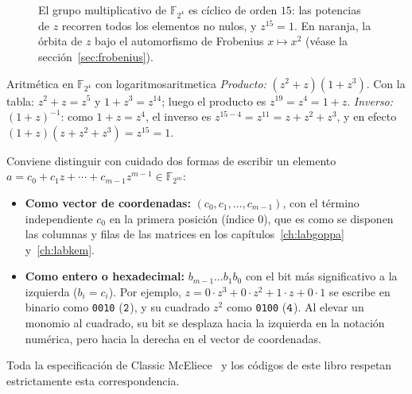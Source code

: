 \documentclass[11pt,a4paper,oneside]{report}
\newcommand{\F}{\mathbb{F}}
\newcommand{\GF}[1]{\mathbb{F}_{#1}}
\newcommand{\FF}[1]{\F_{2^{#1}}}
\newcommand{\hx}[1]{\text{\texttt{#1}}}
\begin{document}
\begin{figure}[htbp]
\centering
{}
\caption{El grupo multiplicativo de $\FF4$ es cíclico de orden $15$: las
potencias de $z$ recorren todos los elementos no nulos, y $z^{15}=1$. En
naranja, la órbita de $z$ bajo el automorfismo de Frobenius
$x\mapsto x^2$ (véase la sección~\ref{sec:frobenius}).}
\label{fig:ciclo-z}
\end{figure}

\begin{ejemplo}{Aritmética en $\FF4$ con logaritmos}{aritmetica}
\emph{Producto:} $(z^2+z)(1+z^3)$. Con la tabla:
$z^2+z=z^5$ y $1+z^3=z^{14}$; luego el producto es $z^{19}=z^{4}=1+z$.
\emph{Inverso:} $(1+z)^{-1}$: como $1+z=z^4$, el inverso es
$z^{15-4}=z^{11}=z+z^2+z^3$, y en efecto
$(1+z)(z+z^2+z^3)=z^{15}=1$.
\end{ejemplo}

\begin{trampa}
Conviene distinguir con cuidado dos formas de escribir un elemento
$a = c_0 + c_1 z + \cdots + c_{m-1}z^{m-1} \in \GF{2^m}$:
\begin{itemize}[leftmargin=1.4em,itemsep=2pt]
  \item \textbf{Como vector de coordenadas:} $(c_0, c_1, \dots, c_{m-1})$,
        con el término independiente $c_0$ en la primera posición (índice $0$),
        que es como se disponen las columnas y filas de las matrices en los
        capítulos~\ref{ch:labgoppa} y~\ref{ch:labkem}.
  \item \textbf{Como entero o hexadecimal:} $b_{m-1}\dots b_1 b_0$ con el bit más
        significativo a la izquierda ($b_i = c_i$). Por ejemplo,
        $z = 0\cdot z^3 + 0\cdot z^2 + 1\cdot z + 0\cdot 1$ se escribe en binario
        como \texttt{0010} ($\hx 2$), y su cuadrado $z^2$ como \texttt{0100}
        ($\hx 4$). Al elevar un monomio al cuadrado, su bit se desplaza hacia la
        izquierda en la notación numérica, pero hacia la derecha en el vector de
        coordenadas.
\end{itemize}
Toda la especificación de Classic McEliece~\cite{cmspec} y los códigos de este
libro respetan estrictamente esta correspondencia.
\end{trampa}
\end{document}
